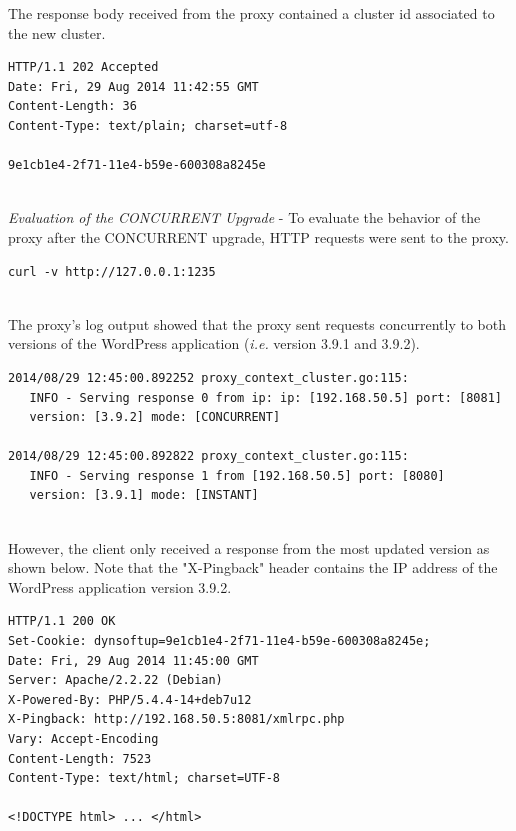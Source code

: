 \documentclass[a4paper,11pt,twoside]{report}
\begin{document}
\noindent
The response body received from the proxy contained a cluster id associated to the new cluster.\smallskip

\begin{lstlisting}[language=terminal]
HTTP/1.1 202 Accepted
Date: Fri, 29 Aug 2014 11:42:55 GMT
Content-Length: 36
Content-Type: text/plain; charset=utf-8

9e1cb1e4-2f71-11e4-b59e-600308a8245e
\end{lstlisting} 

\noindent\\
\textit{Evaluation of the CONCURRENT Upgrade} - To evaluate the behavior of the proxy after the CONCURRENT upgrade, HTTP requests were sent to the proxy. \smallskip

\begin{lstlisting}[language=terminal]
curl -v http://127.0.0.1:1235
\end{lstlisting}

\noindent\\ 
The proxy's log output showed that the proxy sent requests concurrently to both versions of the WordPress application (\textit{i.e.} version 3.9.1 and 3.9.2). \smallskip 

\begin{lstlisting}[language=terminal]
2014/08/29 12:45:00.892252 proxy_context_cluster.go:115:     
   INFO - Serving response 0 from ip: ip: [192.168.50.5] port: [8081] 
   version: [3.9.2] mode: [CONCURRENT]

2014/08/29 12:45:00.892822 proxy_context_cluster.go:115:     
   INFO - Serving response 1 from [192.168.50.5] port: [8080] 
   version: [3.9.1] mode: [INSTANT]
\end{lstlisting}

\noindent\\
However, the client only received a response from the most updated version as shown below. Note that the "X-Pingback" header contains the IP address of the WordPress application version 3.9.2. \smallskip

\begin{lstlisting}[language=terminal]
HTTP/1.1 200 OK
Set-Cookie: dynsoftup=9e1cb1e4-2f71-11e4-b59e-600308a8245e;
Date: Fri, 29 Aug 2014 11:45:00 GMT
Server: Apache/2.2.22 (Debian)
X-Powered-By: PHP/5.4.4-14+deb7u12
X-Pingback: http://192.168.50.5:8081/xmlrpc.php
Vary: Accept-Encoding
Content-Length: 7523
Content-Type: text/html; charset=UTF-8

<!DOCTYPE html> ... </html>
\end{lstlisting}
\end{document}
